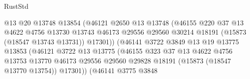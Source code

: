 \begin{lexlean}{RustStd}
\begin{coremodule}
                                        @13
                                        @20
                                        @13748
                                        @13854
                                        (@46121
                                          @2650
                                          @13
                                          @13748
                                          (@46155
                                            @220
                                            @37
                                            @13
                                            @4622
                                            @4756
                                            @13730
                                            @13743
                                            @46173
                                            @29556
                                            @29560
                                            @30214
                                            @18191
                                            (@15873 (@18547 @13743 @13731))
                                            @17301))
                                        (@46141
                                          @3722
                                          @3849
                                          @13
                                          @19
                                          @13775
                                          @13853
                                          (@46121
                                            @3722
                                            @13
                                            @13775
                                            (@46155
                                              @323
                                              @37
                                              @13
                                              @4622
                                              @4756
                                              @13753
                                              @13770
                                              @46173
                                              @29556
                                              @29560
                                              @29828
                                              @18191
                                              (@15873 (@18547 @13770 @13754))
                                              @17301))
                                          (@46141
                                            @3775
                                            @3848

\end{coremodule}
\end{lexlean}
